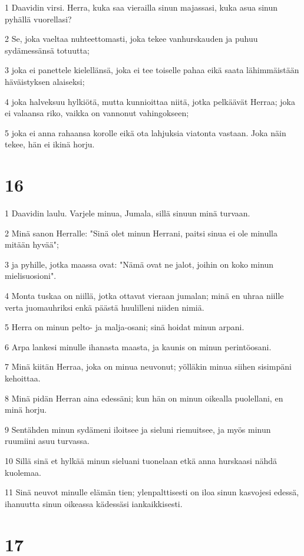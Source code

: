 \par 1 Daavidin virsi. Herra, kuka saa vierailla sinun majassasi, kuka asua sinun pyhällä vuorellasi?
\par 2 Se, joka vaeltaa nuhteettomasti, joka tekee vanhurskauden ja puhuu sydämessänsä totuutta;
\par 3 joka ei panettele kielellänsä, joka ei tee toiselle pahaa eikä saata lähimmäistään häväistyksen alaiseksi;
\par 4 joka halveksuu hylkiötä, mutta kunnioittaa niitä, jotka pelkäävät Herraa; joka ei valaansa riko, vaikka on vannonut vahingokseen;
\par 5 joka ei anna rahaansa korolle eikä ota lahjuksia viatonta vastaan. Joka näin tekee, hän ei ikinä horju.

\chapter{16}

\par 1 Daavidin laulu. Varjele minua, Jumala, sillä sinuun minä turvaan.
\par 2 Minä sanon Herralle: "Sinä olet minun Herrani, paitsi sinua ei ole minulla mitään hyvää";
\par 3 ja pyhille, jotka maassa ovat: "Nämä ovat ne jalot, joihin on koko minun mielisuosioni".
\par 4 Monta tuskaa on niillä, jotka ottavat vieraan jumalan; minä en uhraa niille verta juomauhriksi enkä päästä huulilleni niiden nimiä.
\par 5 Herra on minun pelto- ja malja-osani; sinä hoidat minun arpani.
\par 6 Arpa lankesi minulle ihanasta maasta, ja kaunis on minun perintöosani.
\par 7 Minä kiitän Herraa, joka on minua neuvonut; yölläkin minua siihen sisimpäni kehoittaa.
\par 8 Minä pidän Herran aina edessäni; kun hän on minun oikealla puolellani, en minä horju.
\par 9 Sentähden minun sydämeni iloitsee ja sieluni riemuitsee, ja myös minun ruumiini asuu turvassa.
\par 10 Sillä sinä et hylkää minun sieluani tuonelaan etkä anna hurskaasi nähdä kuolemaa.
\par 11 Sinä neuvot minulle elämän tien; ylenpalttisesti on iloa sinun kasvojesi edessä, ihanuutta sinun oikeassa kädessäsi iankaikkisesti.

\chapter{17}

